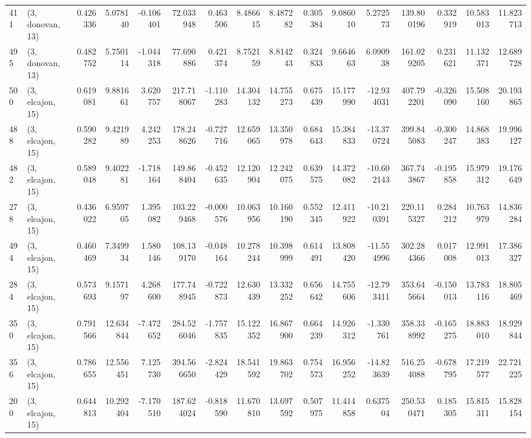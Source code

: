 \begin{tabular}{llrrrrrrrrrrrrrr}
411 &  (3, donovan, 13) &   0.426336 &   5.078140 &  -0.106401 &    72.033948 &   0.463506 &   8.486615 &   8.487282 &  0.305384 &   9.086010 &   5.272573 &    139.800196 &   0.332919 &  10.583013 &   11.823713 \\
495 &  (3, donovan, 13) &   0.482752 &   5.750114 &  -1.044318 &    77.690886 &   0.421374 &   8.752159 &   8.814243 &  0.324833 &   9.664663 &   6.090938 &    161.029205 &   0.231621 &  11.132371 &   12.689728 \\
500 &  (3, elcajon, 15) &   0.619081 &   9.881661 &   3.620757 &   217.718067 &  -1.110283 &  14.304132 &  14.755273 &  0.675439 &  15.177990 & -12.934031 &    407.792201 &  -0.326090 &  15.508160 &   20.193865 \\
488 &  (3, elcajon, 15) &   0.590282 &   9.421989 &   4.242253 &   178.248626 &  -0.727716 &  12.659065 &  13.350978 &  0.684643 &  15.384833 & -13.370724 &    399.845083 &  -0.300247 &  14.868383 &   19.996127 \\
482 &  (3, elcajon, 15) &   0.589048 &   9.402281 &  -1.718164 &   149.868404 &  -0.452635 &  12.120904 &  12.242075 &  0.639575 &  14.372082 & -10.602143 &    367.743867 &  -0.195858 &  15.979312 &   19.176649 \\
278 &  (3, elcajon, 15) &   0.436022 &   6.959705 &   1.395082 &   103.229468 &  -0.000576 &  10.063956 &  10.160190 &  0.552345 &  12.411922 & -10.210391 &    220.115327 &   0.284212 &  10.763979 &   14.836284 \\
494 &  (3, elcajon, 15) &   0.460469 &   7.349934 &   1.580146 &   108.139170 &  -0.048164 &  10.278244 &  10.398999 &  0.614491 &  13.808420 & -11.554996 &    302.284366 &   0.017008 &  12.991013 &   17.386327 \\
284 &  (3, elcajon, 15) &   0.573693 &   9.157197 &   4.268600 &   177.748945 &  -0.722873 &  12.630439 &  13.332252 &  0.656642 &  14.755606 & -12.793411 &    353.645664 &  -0.150013 &  13.783116 &   18.805469 \\
350 &  (3, elcajon, 15) &   0.791566 &  12.634844 &  -7.472652 &   284.526046 &  -1.757835 &  15.122352 &  16.867900 &  0.664239 &  14.926312 &  -1.330761 &    358.338992 &  -0.165275 &  18.883010 &   18.929844 \\
356 &  (3, elcajon, 15) &   0.786655 &  12.556451 &   7.125730 &   394.566650 &  -2.824429 &  18.541592 &  19.863702 &  0.754573 &  16.956252 & -14.823639 &    516.254088 &  -0.678795 &  17.219577 &   22.721225 \\
200 &  (3, elcajon, 15) &   0.644813 &  10.292404 &  -7.170510 &   187.624024 &  -0.818590 &  11.670810 &  13.697592 &  0.507975 &  11.414858 &   0.637504 &    250.530471 &   0.185305 &  15.815311 &   15.828154 \\

\end{tabular}
